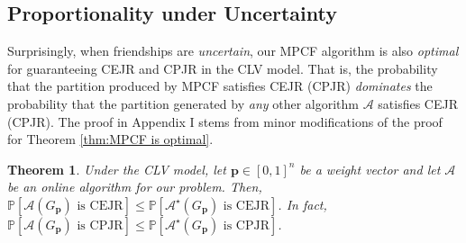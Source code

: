 \documentclass[letterpaper]{article} %
\newtheorem{theorem}{Theorem}
\begin{document}

\subsection{Proportionality under Uncertainty}
\label{sec:Proportionality under Uncertainty}
Surprisingly, when friendships are \textit{uncertain}, our MPCF algorithm is also \textit{optimal} for guaranteeing CEJR and CPJR in the CLV model. That is, the probability that the partition produced by MPCF satisfies CEJR (CPJR) \textit{dominates} the probability that the partition generated by \textit{any} other algorithm $\mathcal{A}$ satisfies CEJR (CPJR). The proof in Appendix I stems from minor modifications of the proof for Theorem \ref{thm:MPCF is optimal}.
\begin{theorem}
    \label{thm:MPCF is optimal for CEJR}
    Under the CLV model, let $\mathbf{p} \in [0,1]^n$ be a weight vector and let $\mathcal{A}$ be an online algorithm for our problem. Then, $\mathbb{P}[\mathcal{A}(G_{\mathbf{p}}) \text{ is CEJR}] \leq \mathbb{P}[\mathcal{A}^\star(G_{\mathbf{p}}) \text{ is CEJR}]$. In fact, $\mathbb{P}[\mathcal{A}(G_{\mathbf{p}}) \text{ is CPJR}] \leq \mathbb{P}[\mathcal{A}^\star(G_{\mathbf{p}}) \text{ is CPJR}]$.
\end{theorem}
\end{document}
